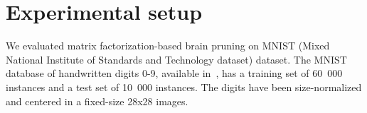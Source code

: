 \documentclass{article} %
\begin{document}



\section{Experimental setup}

We evaluated matrix factorization-based brain pruning on MNIST (Mixed National
Institute of Standards and Technology dataset) dataset. The MNIST database of
handwritten digits 0-9, available in~\cite{lecun-mnisthandwrittendigit-2010},
has a training set of 60~000 instances and a test set of 10~000 instances. The
digits have been size-normalized and centered in a fixed-size 28x28 images.
\end{document}
